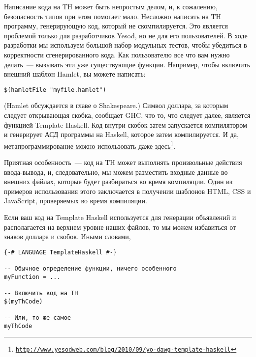 
Написание кода на TH может быть непростым делом, и, к сожалению, безопасность типов при этом помогает мало. Несложно написать на TH программу, генерирующую код, который не скомпилируется. Это является проблемой только для разработчиков Yesod, но не для его пользователей. В ходе разработки мы используем большой набор модульных тестов, чтобы убедиться в корректности сгенерированного кода. Как пользователю все что вам нужно делать~--- вызывать эти уже существующие функции. Например, чтобы включить внешний шаблон Hamlet, вы можете написать:

\begin{lstlisting}
$(hamletFile "myfile.hamlet")
\end{lstlisting}

(Hamlet обсуждается в главе о Shakespeare.) Символ доллара, за которым следует открывающая скобка, сообщает GHC, что то, что следует далее, является функцией Template Haskell. Код внутри скобок затем запускается компилятором и генерирует АСД программы на Haskell, которое затем компилируется. И да, \href{http://www.yesodweb.com/blog/2010/09/yo-dawg-template-haskell}{метапрограммирование можно использовать даже здесь}\footnote{\href{http://www.yesodweb.com/blog/2010/09/yo-dawg-template-haskell}{\texttt{http://www.yesodweb.com/blog/2010/09/yo-dawg-template-haskell}}}.

Приятная особенность~--- код на TH может выполнять произвольные действия ввода-вывода, и, следовательно, мы можем разместить входные данные во внешних файлах, которые будет разбираться во время компиляции. Один из примеров использования этого заключается в получении шаблонов HTML, CSS и JavaScript, проверяемых во время компиляции.

Если ваш код на Template Haskell используется для генерации объявлений и располагается на верхнем уровне наших файлов, то мы можем избавиться от знаков доллара и скобок. Иными словами,

\begin{lstlisting}
{-# LANGUAGE TemplateHaskell #-}

-- Обычное определение функции, ничего особенного
myFunction = ...

-- Включить код на TH
$(myThCode)

-- Или, то же самое
myThCode
\end{lstlisting}

